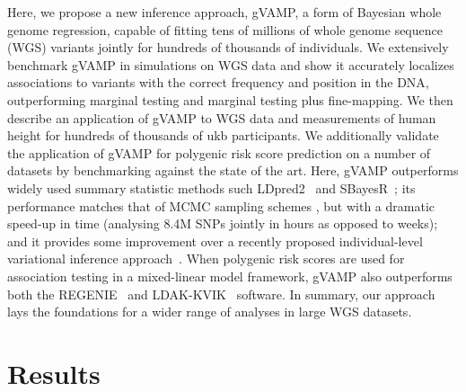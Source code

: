 Here, we propose a new inference approach, gVAMP, a form of Bayesian whole genome regression, capable of fitting tens of millions of whole genome sequence (WGS) variants jointly for hundreds of thousands of individuals. We extensively benchmark gVAMP in simulations on WGS data and show it accurately localizes associations to variants with the correct frequency and position in the DNA, outperforming marginal testing and marginal testing plus fine-mapping. We then describe an application of gVAMP to WGS data and measurements of human height for hundreds of thousands of \gls{ukb} participants. We additionally validate the application of gVAMP for polygenic risk score prediction on a number of datasets by benchmarking against the state of the art. Here, gVAMP outperforms widely used summary statistic methods such LDpred2~\cite{ldpred} and SBayesR~\cite{sbayesr}; its performance matches that of MCMC sampling schemes \cite{Orliac2022}, but with a dramatic speed-up in time (analysing 8.4M SNPs jointly in hours as opposed to weeks); and it provides some improvement over a recently proposed individual-level variational inference approach~\cite{hof2024ldak}. When polygenic risk scores are used for association testing in a mixed-linear model framework, gVAMP also outperforms both the REGENIE~\cite{regenie} and LDAK-KVIK~\cite{hof2024ldak} software. In summary, our approach lays the foundations for a wider range of analyses in large WGS datasets.

\section{Results}

